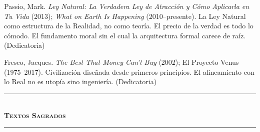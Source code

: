 \documentclass[10pt, openany, oneside]{book}
\renewcommand{\normalsize}{\fontsize{10}{13}\selectfont}
\renewcommand{\footnotesize}{\fontsize{8.5}{11}\selectfont}
\begin{document}
\vspace{1em}

{\footnotesize

\noindent Passio, Mark. \textit{Ley Natural: La Verdadera Ley de Atracción y Cómo Aplicarla en Tu Vida} (2013); \textit{What on Earth Is Happening} (2010--presente). La Ley Natural como estructura de la Realidad, no como teoría. El precio de la verdad es todo lo cómodo. El fundamento moral sin el cual la arquitectura formal carece de raíz. (Dedicatoria)

\vspace{0.3em}

\noindent Fresco, Jacques. \textit{The Best That Money Can't Buy} (2002); El Proyecto Venus (1975--2017). Civilización diseñada desde primeros principios. El alineamiento con lo Real no es utopía sino ingeniería. (Dedicatoria)

}

\vspace{1.5em}

\begin{center}
    \rule{0.3\textwidth}{0.4pt}\\[0.5em]
    {\normalsize\bfseries\scshape Textos Sagrados}\\[0.3em]
    \rule{0.3\textwidth}{0.4pt}
\end{center}

\vspace{1em}
\end{document}
